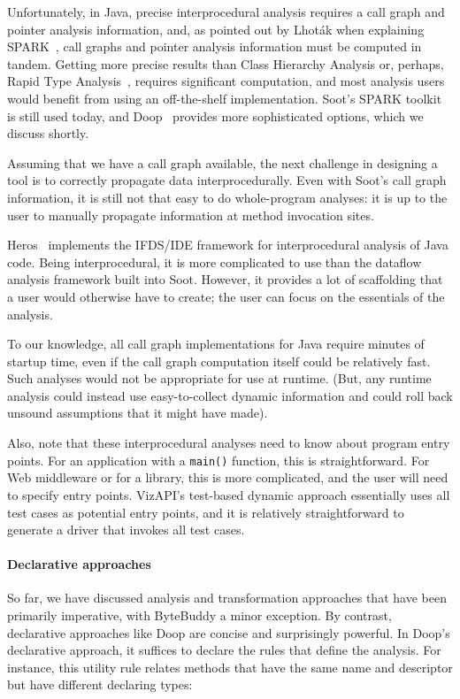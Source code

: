 Unfortunately, in Java, precise interprocedural analysis requires a
call graph and pointer analysis information, and, as pointed out by
Lhot\'ak when explaining SPARK~\cite{lhot02}, call graphs and pointer analysis information must be
computed in tandem. Getting more precise results than Class Hierarchy
Analysis or, perhaps, Rapid Type
Analysis~\cite{bacon96:_fast_static_analy_c_virtual_funct_calls},
requires significant computation, and most analysis users would
benefit from using an off-the-shelf implementation. Soot's SPARK
toolkit is still used today, and
Doop~\cite{bravenboer09:_stric_declar_specif_sophis_point_analy}
provides more sophisticated options, which we discuss shortly.

Assuming that we have a call graph available, the next challenge in
designing a tool is to correctly propagate data interprocedurally.
Even with Soot's call graph information, it is still not that easy to
do whole-program analyses: it is up to the user to manually propagate
information at method invocation sites.

Heros~\cite{bodden12:_inter_proced_data_flow_analy} implements the
IFDS/IDE framework for interprocedural analysis of Java code. Being
interprocedural, it is more complicated to use than the dataflow analysis
framework built into Soot. However, it provides a lot of scaffolding
that a user would otherwise have to create; the user can focus on the
essentials of the analysis.

To our knowledge, all call graph implementations for Java require
minutes of startup time, even if the call graph computation itself
could be relatively fast. Such analyses would not be appropriate for
use at runtime. (But, any runtime analysis could instead use
easy-to-collect dynamic information and could roll back unsound
assumptions that it might have made).

Also, note that these interprocedural analyses need to know about
program entry points.  For an application with a \texttt{main()}
function, this is straightforward.  For Web middleware or for a
library, this is more complicated, and the user will need to specify
entry points. VizAPI's test-based dynamic approach essentially uses
all test cases as potential entry points, and it is relatively
straightforward to generate a driver that invokes all test cases.

\paragraph{Declarative approaches}
So far, we have discussed analysis and transformation approaches that have
been primarily imperative, with ByteBuddy a minor exception. By contrast,
declarative approaches like Doop are concise and surprisingly powerful.
In Doop's declarative approach, it suffices to declare the rules that
define the analysis. For instance, this utility rule relates methods
that have the same name and descriptor but have different declaring types:

